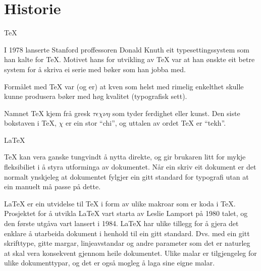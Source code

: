 	\section{Historie}
\label{sec:history}

\begin{frame}{\TeX}
	
	I 1978 lanserte Stanford proffessoren Donald Knuth eit typesettingssystem som han kalte for \TeX{}. Motivet hans for utvikling av \TeX{} var at han ønskte eit betre system for å skriva ei serie med bøker som han jobba med.
	
	Formålet med \TeX{} var (og er) at kven som helst med rimelig enkelthet skulle kunne produsera bøker med høg kvalitet (typografisk sett).
	
	Namnet \TeX{} kjem frå gresk \(\tau\epsilon\chi\nu\eta\) som tyder ferdighet eller kunst. Den siste bokstaven i \TeX{}, $\chi$ er ein stor ``chi'', og uttalen av ordet \TeX{} er ``tekh''.
	
\end{frame}

\begin{frame}{\LaTeX}
	
	
	
	\TeX{} kan vera ganske tungvindt å nytta direkte, og gir brukaren litt for mykje fleksibiliet i å styra utforminga av dokumentet. Når ein skriv eit dokument er det normalt ynskjeleg at dokumentet fylgjer ein gitt standard for typografi utan at ein manuelt må passe på dette.
	
	\LaTeX{} er ein utvidelse til \TeX{} i form av ulike makroar som er koda i \TeX{}. Prosjektet for å utvikla \LaTeX{} vart starta av Leslie Lamport på 1980 talet, og den første utgåva vart lansert i 1984. \LaTeX{} har ulike tillegg for å gjera det enklare å utarbeida dokument i henhold til ein gitt standard. Dvs. med ein gitt skrifttype, gitte margar, linjeavstandar og andre parameter som det er naturleg at skal vera konsekvent gjennom heile dokumentet. Ulike malar er tilgjengeleg for ulike dokumenttypar, og det er også mogleg å laga sine eigne malar.
	
\end{frame}

